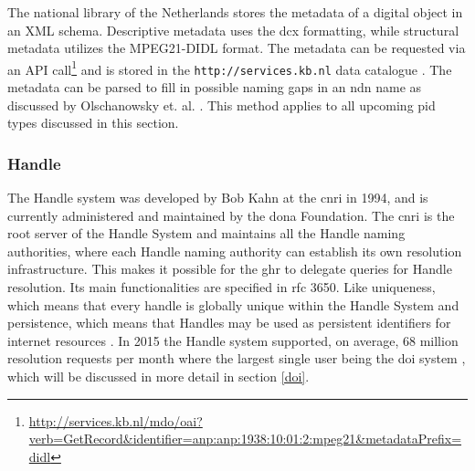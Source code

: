 The national library of the Netherlands stores the metadata of a digital object in an XML schema. Descriptive metadata uses the \gls{dcx} formatting, while structural metadata utilizes the MPEG21-DIDL format. The metadata can be requested via an API call\footnote{\url{http://services.kb.nl/mdo/oai?verb=GetRecord&identifier=anp:anp:1938:10:01:2:mpeg21&metadataPrefix=didl}} and is stored in the 
\texttt{http://services.kb.nl} data catalogue \cite{kb-urn}. The metadata can be parsed to fill in possible naming gaps in an \gls{ndn} name as discussed by Olschanowsky et. al. \cite{ndn-clim}. This method applies to all upcoming \gls{pid} types discussed in this section.

\subsubsection{Handle}\label{hndl}
The Handle system was developed by Bob Kahn at the \gls{cnri} in 1994, and is currently administered and maintained by the \gls{dona} Foundation. The \gls{cnri} is the root server of the Handle System and maintains all the Handle naming authorities, where each Handle naming authority can establish its own resolution infrastructure. This makes it possible for the \gls{ghr} to delegate queries for Handle resolution. 
Its main functionalities are specified in \gls{rfc} 3650. Like uniqueness, which means that every handle is globally unique within the Handle System and persistence, which means that Handles may be used as persistent identifiers for internet resources \cite{rfc3650}. In 2015 the Handle system supported, on average, 68 million resolution requests per month where the largest single user being the \gls{doi} system \cite{hdl-us}, which will be discussed in more detail in section \ref{doi}. 

